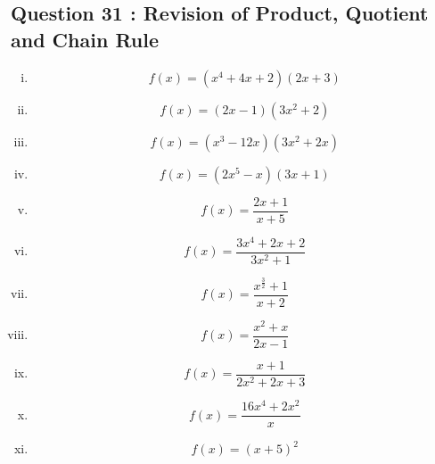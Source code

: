 \documentclass[]{article}
\begin{document}
\subsection*{Question 31 : Revision of Product, Quotient and Chain Rule}
\begin{multicols}{2}
	\begin{enumerate}[(i)]
		\item		 \[ f(x) = (x^4+4x+2)(2x+3) \,\] %
		\item		 \[ f(x) = (2x-1)(3x^2+2) \,\] %
		\item		 \[ f(x) = (x^3-12x)(3x^2+2x) \,\] %
		\item		 \[ f(x) = (2x^5-x)(3x+1) \,\] %
		\item		\[ f(x) = \frac{2x+1}{x+5} \,\] %
		\item		 \[ f(x) = \frac{3x^4+2x +2}{3x^2+1} \,\] %
		\item		 \[ f(x) = \frac{x^\frac{3}{2}+1}{x+2} \,\] %
		\item		\[ f(x) = \frac{x^2+x}{2x-1} \,\] %
		\item		 \[ f(x) = \frac{x+1}{2x^2+2x+3} \,\] %
		\item		 \[ f(x) = \frac{16x^4+2x^2}{x} \,\] %
		\item		\[ f(x) = (x+5)^2 \,\] %

\end{enumerate}
\end{multicols}
\end{document}
